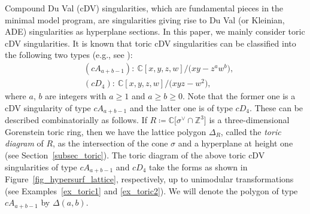 \documentclass[pdftex]{sigma}
\numberwithin{equation}{section}
\theoremstyle{definition}
\newcommand{\ZZ}{\mathbb{Z}}
\newcommand{\CC}{\mathbb{C}}
\begin{document}
Compound Du Val (cDV) singularities, which are fundamental pieces in the minimal model program,
are singularities giving rise to Du Val (or Kleinian, ADE) singularities as hyperplane sections.
In this paper, we mainly consider toric cDV singularities.
It is known that toric cDV singularities can be classified into the following two types (e.g., see \cite[footnote~18]{Dais_toric}):
\begin{align*}
& (cA_{a+b-1})\colon \ \CC[x,y,z,w]/\bigl(xy-z^aw^b\bigr), \\
& (cD_4)\colon \ \CC[x,y,z,w]/\bigl(xyz-w^2\bigr),
\end{align*}
where $a$, $b$ are integers with $a\ge 1$ and $a\ge b\ge0$.
Note that the former one is a cDV singularity of type $cA_{a+b-1}$ and the latter one is of type $cD_4$.
These can be described combinatorially as follows.
If $R\coloneqq\CC\bigl[\sigma^\vee\cap \ZZ^3\bigr]$ is a three-dimensional Gorenstein toric ring, then we have the lattice polygon $\Delta_R$,
called the \emph{toric diagram} of $R$, as the intersection of the cone $\sigma$ and a hyperplane at height one (see Section~\ref{subsec_toric}).
The toric diagram of the above toric cDV singularities of type $cA_{a+b-1}$ and $cD_4$ take the forms
as shown in Figure~\ref{fig_hypersurf_lattice}, respectively, up to unimodular transformations (see Examples~\ref{ex_toric1} and \ref{ex_toric2}).
We will denote the polygon of type $cA_{a+b-1}$ by $\Delta(a,b)$.
\end{document}
